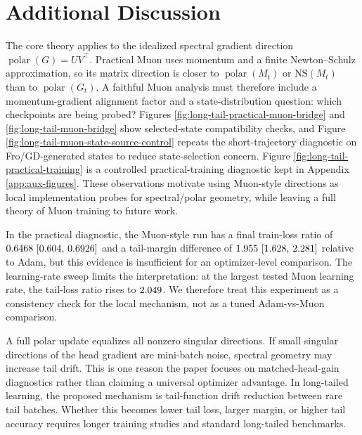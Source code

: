 \documentclass{article}
\theoremstyle{definition}
\newcommand{\polar}{\operatorname{polar}}
\begin{document}
\section{Additional Discussion}
\label{app:additional-discussion}

The core theory applies to the idealized spectral gradient direction \(\polar(G)=UV^\top\). Practical Muon uses momentum and a finite Newton--Schulz approximation, so its matrix direction is closer to \(\polar(M_t)\) or \(\mathrm{NS}(M_t)\) than to \(\polar(G_t)\). A faithful Muon analysis must therefore include a momentum-gradient alignment factor and a state-distribution question: which checkpoints are being probed? Figures \ref{fig:long-tail-practical-muon-bridge} and \ref{fig:long-tail-muon-bridge} show selected-state compatibility checks, and Figure \ref{fig:long-tail-muon-state-source-control} repeats the short-trajectory diagnostic on Fro/GD-generated states to reduce state-selection concern. Figure \ref{fig:long-tail-practical-training} is a controlled practical-training diagnostic kept in Appendix \ref{app:aux-figures}. These observations motivate using Muon-style directions as local implementation probes for spectral/polar geometry, while leaving a full theory of Muon training to future work.

In the practical diagnostic, the Muon-style run has a final train-loss ratio of \(0.6468 ~\text{[0.604,\hspace{0.35em}0.6926]}\) and a tail-margin difference of \(1.955 ~\text{[1.628,\hspace{0.35em}2.281]}\) relative to Adam, but this evidence is insufficient for an optimizer-level comparison. The learning-rate sweep limits the interpretation: at the largest tested Muon learning rate, the tail-loss ratio rises to \(2.049\). We therefore treat this experiment as a consistency check for the local mechanism, not as a tuned Adam-vs-Muon comparison.

A full polar update equalizes all nonzero singular directions. If small singular directions of the head gradient are mini-batch noise, spectral geometry may increase tail drift. This is one reason the paper focuses on matched-head-gain diagnostics rather than claiming a universal optimizer advantage. In long-tailed learning, the proposed mechanism is tail-function drift reduction between rare tail batches. Whether this becomes lower tail loss, larger margin, or higher tail accuracy requires longer training studies and standard long-tailed benchmarks.
\end{document}
